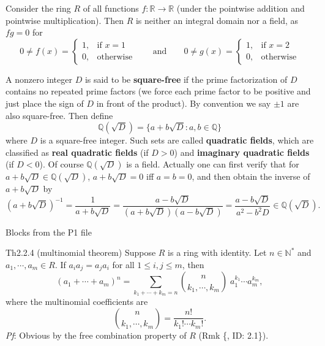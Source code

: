 \documentclass{article}
\begin{document}
\begin{Rmk_continued}{}
    \begin{compactenum}
        \item[3.] \textcolor{Th}{Consider the ring $R$ of all functions $f: \mathbb{R} \to \mathbb{R}$ (under the pointwise addition and pointwise multiplication). Then $R$ is neither an integral domain nor a field, as $fg = 0$ for 
        $$ 0\neq f(x) = \begin{cases}
            1, & \text{if } x = 1 \\
            0, & \text{otherwise}
        \end{cases} \qquad\text{and}\qquad
        0\neq g(x) = \begin{cases}
            1, & \text{if } x = 2 \\
            0, & \text{otherwise}
        \end{cases} $$ }
        \item[4.] \textcolor{Df}{A nonzero integer $D$ is said to be \textbf{square-free} if the prime factorization of $D$ contains no repeated prime factors (we force each prime factor to be positive and just place the sign of $D$ in front of the product). By convention we say $\pm 1$ are also square-free}. Then \textcolor{Df}{define $$ \mathbb{Q}(\sqrt{D}) = \{a + b\sqrt{D}: a, b \in \mathbb{Q}\} $$
        where $D$ is a square-free integer. Such sets are called \textbf{quadratic fields}, which are classified as \textbf{real quadratic fields} (if $D>0$) and \textbf{imaginary quadratic fields} (if $D<0$).} Of course \textcolor{Th}{$\mathbb{Q}(\sqrt{D})$ is a field.} Actually one can first verify that \textcolor{Th}{for $a+b\sqrt{D}\in\mathbb{Q}(\sqrt{D})$, $a+b\sqrt{D} = 0$ iff $a = b = 0$,} and then \textcolor{Th}{obtain the inverse of $a+b\sqrt{D}$ by
        $$ (a+b\sqrt{D})^{-1} = \frac{1}{a+b\sqrt{D}} = \frac{a-b\sqrt{D}}{(a+b\sqrt{D})(a-b\sqrt{D})} = \frac{a-b\sqrt{D}}{a^2 - b^2 D} \in \mathbb{Q}(\sqrt{D}). $$}
    \end{compactenum}
\end{Rmk_continued}

\begin{Th}{Blocks from the P1 file}
\end{Th}

\begin{Th}{Th2.2.4 (multinomial theorem)}
    Suppose $R$ is a ring with identity. Let $n\in\mathbb{N}^\ast$ and $a_1, \cdots, a_m\in R$. If $a_i a_j = a_j a_i$ for all $1\leq i, j \leq m$, then
    $$ (a_1 + \cdots + a_m)^n = \sum_{k_1 + \cdots + k_m = n} \binom{n}{k_1, \cdots, k_m} \; a_1^{k_1} \cdots a_m^{k_m}, $$
    where the multinomial coefficients are
    $$ \binom{n}{k_1, \cdots, k_m} = \frac{n!}{k_1! \cdots k_m!}. $$
    \tcblower
    \textit{Pf}: Obvious by the free combination property of $R$ (Rmk \{, ID: 2.1\}).
\end{Th}
\end{document}
